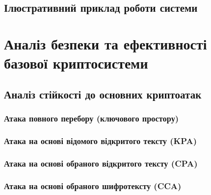 \documentclass[a4paper,12pt]{article}
\begin{document}
    \subsection{Ілюстративний приклад роботи системи} %

    \newpage


    \section{Аналіз безпеки та ефективності базової криптосистеми} %

    \subsection{Аналіз стійкості до основних криптоатак} %

    \subsubsection{Атака повного перебору (ключового простору)} %

    \subsubsection{Атака на основі відомого відкритого тексту (KPA)} %

    \subsubsection{Атака на основі обраного відкритого тексту (CPA)} %

    \subsubsection{Атака на основі обраного шифротексту (CCA)} %
\end{document}
